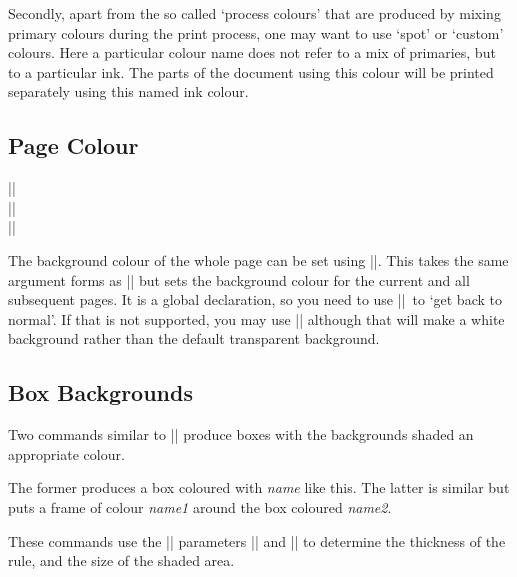 Secondly, apart from the so called `process colours' that are produced
by mixing primary colours during the print process, one may want to use
`spot' or `custom' colours. Here a particular colour name does not
refer to a mix of primaries, but to a particular ink. The parts of the
document using this colour will be printed separately using this named
ink colour.

\subsection{Page Colour}


\begin{decl}
|\pagecolor|\\
|\pagecolor|\\
|\nopagecolor|
\end{decl}

The background colour of the whole page can be set using
|\pagecolor|. This takes the same argument forms as |\color| but sets
the background colour for the current and all subsequent pages. It is
a global declaration, so you need to  use
|\nopagecolor|\ to `get back to normal'.
If that is not supported, you may use |\pagecolor{white}| although that
will make a white background rather than the default transparent background.

\subsection{Box Backgrounds}
Two commands similar to |\fbox| produce boxes with the backgrounds
shaded an appropriate colour.



The former produces a box coloured with \emph{name}
\colorbox{mygrey}{like this}. The latter is similar but puts a frame of
colour \emph{name1} around the box coloured \emph{name2}.

These commands use the |\fbox| parameters |\fboxrule| and |\fboxsep|
to determine the thickness of the rule, and the size of the shaded area.

